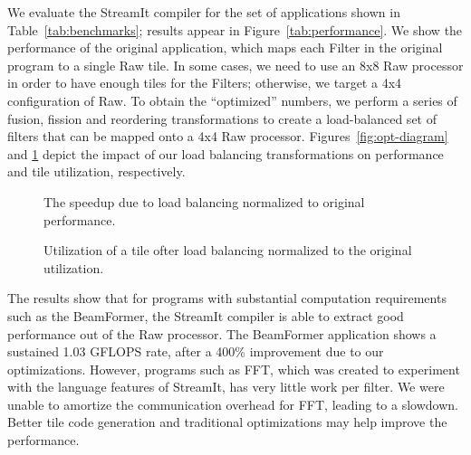 We evaluate the StreamIt compiler for the set of applications shown in
Table~\ref{tab:benchmarks}; results appear in
Figure~\ref{tab:performance}.  We show the performance of the original
application, which maps each Filter in the original program to a
single Raw tile.  In some cases, we need to use an 8x8 Raw processor
in order to have enough tiles for the Filters; otherwise, we target a
4x4 configuration of Raw.  To obtain the ``optimized'' numbers, we
perform a series of fusion, fission and reordering transformations to
create a load-balanced set of filters that can be mapped onto a 4x4
Raw processor. Figures~\ref{fig:opt-diagram} and
\ref{fig:utilization-diagram} depict the impact of our load balancing
transformations on performance and tile utilization, respectively.

\begin{figure}
\begin{minipage}{3.2in}
\centering
{}
\caption{The speedup due to load balancing normalized to original performance.
\protect\label{fig:opt-diagram}}
\end{minipage}
\hspace{0.1in}
\begin{minipage}{3.2in}
\centering
{}
\caption{Utilization of a tile ofter load balancing normalized to the original utilization.\protect\label{fig:utilization-diagram}}
\end{minipage}
\end{figure}

The results show that for programs with substantial computation
requirements such as the BeamFormer, the StreamIt compiler is able to
extract good performance out of the Raw processor.  The BeamFormer
application shows a sustained 1.03 GFLOPS rate, after a 400\%
improvement due to our optimizations.  However, programs such as FFT,
which was created to experiment with the language features of
StreamIt, has very little work per filter. We were unable to amortize
the communication overhead for FFT, leading to a slowdown.  Better
tile code generation and traditional optimizations may help improve
the performance.

